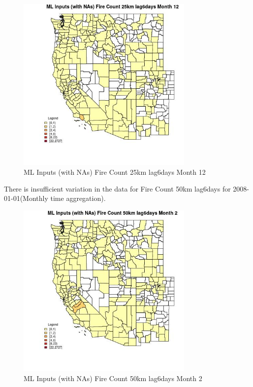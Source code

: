 \begin{figure} 
\centering  
\includegraphics[width=0.77\textwidth]{Code_Outputs/Report_ML_input_PM25_Step4_part_f_de_duplicated_aveswNAs_CountyFire_Count_25km_lag6daysmedianMonth12.jpg} 
\caption{\label{fig:Report_ML_input_PM25_Step4_part_f_de_duplicated_aveswNAsCountyFire_Count_25km_lag6daysmedianMonth12}ML Inputs (with NAs) Fire Count 25km lag6days Month 12} 
\end{figure} 
 

There is insufficient variation in the data for Fire Count 50km lag6days for 2008-01-01(Monthly time aggregation). 
 

\begin{figure} 
\centering  
\includegraphics[width=0.77\textwidth]{Code_Outputs/Report_ML_input_PM25_Step4_part_f_de_duplicated_aveswNAs_CountyFire_Count_50km_lag6daysmedianMonth2.jpg} 
\caption{\label{fig:Report_ML_input_PM25_Step4_part_f_de_duplicated_aveswNAsCountyFire_Count_50km_lag6daysmedianMonth2}ML Inputs (with NAs) Fire Count 50km lag6days Month 2} 
\end{figure} 
 

